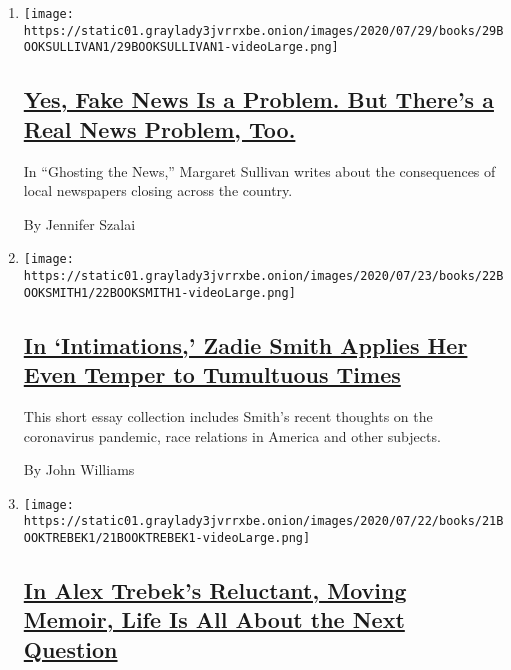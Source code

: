 \begin{enumerate}
\def\labelenumi{\arabic{enumi}.}
\item
  \texttt{[image: https://static01.graylady3jvrrxbe.onion/images/2020/07/29/books/29BOOKSULLIVAN1/29BOOKSULLIVAN1-videoLarge.png]}

  \hypertarget{yes-fake-news-is-a-problem-but-theres-a-real-news-problem-too}{%
  \subsection{\texorpdfstring{\href{/2020/07/26/books/review-ghosting-news-local-journalism-democracy-crisis-margaret-sullivan.html}{Yes,
  Fake News Is a Problem. But There's a Real News Problem,
  Too.}}{Yes, Fake News Is a Problem. But There's a Real News Problem, Too.}}\label{yes-fake-news-is-a-problem-but-theres-a-real-news-problem-too}}

  In ``Ghosting the News,'' Margaret Sullivan writes about the
  consequences of local newspapers closing across the country.

  By Jennifer Szalai
\item
  \texttt{[image: https://static01.graylady3jvrrxbe.onion/images/2020/07/23/books/22BOOKSMITH1/22BOOKSMITH1-videoLarge.png]}

  \hypertarget{in-intimations-zadie-smith-applies-her-even-temper-to-tumultuous-times}{%
  \subsection{\texorpdfstring{\href{/2020/07/22/books/review-intimations-essays-zadie-smith.html}{In
  `Intimations,' Zadie Smith Applies Her Even Temper to Tumultuous
  Times}}{In `Intimations,' Zadie Smith Applies Her Even Temper to Tumultuous Times}}\label{in-intimations-zadie-smith-applies-her-even-temper-to-tumultuous-times}}

  This short essay collection includes Smith's recent thoughts on the
  coronavirus pandemic, race relations in America and other subjects.

  By John Williams
\item
  \texttt{[image: https://static01.graylady3jvrrxbe.onion/images/2020/07/22/books/21BOOKTREBEK1/21BOOKTREBEK1-videoLarge.png]}

  \hypertarget{in-alex-trebeks-reluctant-moving-memoir-life-is-all-about-the-next-question}{%
  \subsection{\texorpdfstring{\href{/2020/07/21/books/review-answer-is-alex-trebek-jeopardy-memoir.html}{In
  Alex Trebek's Reluctant, Moving Memoir, Life Is All About the Next
  Question}}{In Alex Trebek's Reluctant, Moving Memoir, Life Is All About the Next Question}}\label{in-alex-trebeks-reluctant-moving-memoir-life-is-all-about-the-next-question}}


\end{enumerate}
